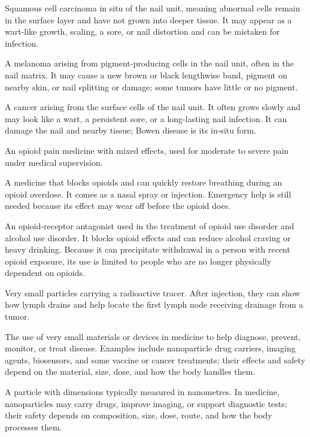  Squamous cell carcinoma in situ of
  the nail unit, meaning abnormal cells remain in the surface layer and
  have not grown into deeper tissue. It may appear as a wart-like growth,
  scaling, a sore, or nail distortion and can be mistaken for infection.

 A melanoma arising from pigment-producing
  cells in the nail unit, often in the nail matrix. It may cause a new
  brown or black lengthwise band, pigment on nearby skin, or nail
  splitting or damage; some tumors have little or no pigment.

 A cancer arising from the
  surface cells of the nail unit. It often grows slowly and may look like
  a wart, a persistent sore, or a long-lasting nail infection. It can
  damage the nail and nearby tissue; Bowen disease is its in-situ form.

 An opioid pain medicine with mixed effects, used for moderate to severe pain under medical supervision.

 A medicine that blocks opioids and can quickly restore breathing during an opioid overdose. It comes as a nasal spray or injection. Emergency help is still needed because its effect may wear off before the opioid does.

 An opioid-receptor antagonist used in the treatment of opioid use disorder and alcohol use disorder. It blocks opioid effects and can reduce alcohol craving or heavy drinking. Because it can precipitate withdrawal in a person with recent opioid exposure, its use is limited to people who are no longer physically dependent on opioids.

 Very small particles carrying a radioactive tracer. After injection, they can show how lymph drains and help locate the first lymph node receiving drainage from a tumor.

 The use of very small materials or devices in medicine to help diagnose, prevent, monitor, or treat disease. Examples include nanoparticle drug carriers, imaging agents, biosensors, and some vaccine or cancer treatments; their effects and safety depend on the material, size, dose, and how the body handles them.

 A particle with dimensions typically measured in nanometres. In medicine, nanoparticles may carry drugs, improve imaging, or support diagnostic tests; their safety depends on composition, size, dose, route, and how the body processes them.


